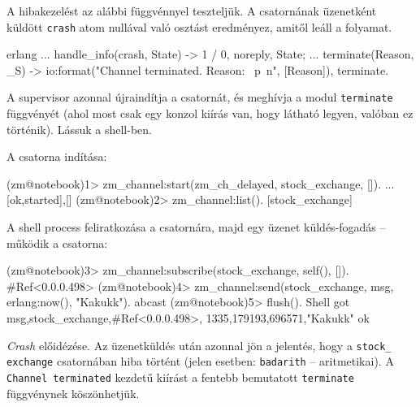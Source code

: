 \documentclass[12pt, a4paper, oneside]{book}
\begin{document}
A hibakezelést az alábbi függvénnyel teszteljük. A csatornának üzenetként
küldött \texttt{crash} atom nullával való osztást eredményez, amitől leáll a
folyamat.

\begin{code}{erlang}{}
...
handle_info(crash, State) ->
  1 / 0, 
  {noreply, State};
...
terminate(Reason, _S) ->
  io:format("Channel terminated. Reason: ~p~n", [Reason]),
  terminate.
\end{code}

A supervisor azonnal újraindítja a csatornát, és meghívja a modul
\texttt{terminate} függvényét (ahol most csak egy konzol kiírás van, hogy
látható legyen, valóban ez történik). Lássuk a shell-ben.

A csatorna indítása:
\begin{code}{}{}
(zm@notebook)1> zm_channel:start(zm_ch_delayed, 
                                 stock_exchange, []).
...
{[{ok,started}],[]}
(zm@notebook)2> zm_channel:list().
[stock_exchange]
\end{code}

A shell process feliratkozása a csatornára, majd egy üzenet küldés-fogadás --
működik a csatorna:

\begin{code}{}{}
(zm@notebook)3> zm_channel:subscribe(stock_exchange, 
                                     self(), []).   
#Ref<0.0.0.498>
(zm@notebook)4> zm_channel:send(stock_exchange, 
                   {msg, {erlang:now(), "Kakukk"}}).
abcast
(zm@notebook)5> flush().                                                         
Shell got {msg,{stock_exchange,#Ref<0.0.0.498>},
               {{1335,179193,696571},"Kakukk"}}
ok
\end{code}

\emph{Crash} előidézése. Az üzenetküldés után azonnal jön a jelentés, hogy a
\texttt{stock\_ exchange} csatornában hiba történt (jelen esetben:
\texttt{badarith} -- aritmetikai). A \texttt{Channel terminated}
kezdetű kiírást a fentebb bemutatott \texttt{terminate} függvénynek
köszönhetjük.
\end{document}
